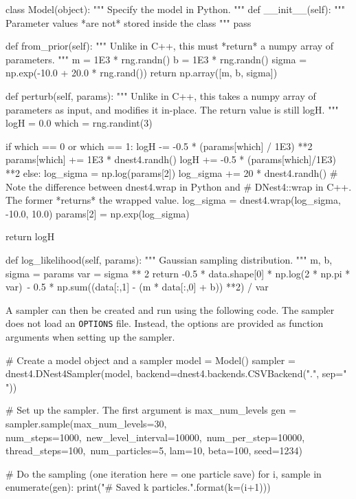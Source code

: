 \documentclass[article, nojss]{jss}
\begin{document}
\begin{CodeChunk}
\begin{CodeInput}
class Model(object):
    """
    Specify the model in Python.
    """
    def __init__(self):
        """
        Parameter values *are not* stored inside the class
        """
        pass

    def from_prior(self):
        """
        Unlike in C++, this must *return* a numpy array of parameters.
        """
        m = 1E3 * rng.randn()
        b = 1E3 * rng.randn()
        sigma = np.exp(-10.0 + 20.0 * rng.rand())
        return np.array([m, b, sigma])

    def perturb(self, params):
        """
        Unlike in C++, this takes a numpy array of parameters as input,
        and modifies it in-place. The return value is still logH.
        """
        logH = 0.0
        which = rng.randint(3)

        if which == 0 or which == 1:
            logH -= -0.5 * (params[which] / 1E3) **2
            params[which] += 1E3 * dnest4.randh()
            logH += -0.5 * (params[which]/1E3) **2
        else:
            log_sigma = np.log(params[2])
            log_sigma += 20 * dnest4.randh()
            # Note the difference between dnest4.wrap in Python and
            # DNest4::wrap in C++. The former *returns* the wrapped value.
            log_sigma = dnest4.wrap(log_sigma, -10.0, 10.0)
            params[2] = np.exp(log_sigma)

        return logH

    def log_likelihood(self, params):
        """
        Gaussian sampling distribution.
        """
        m, b, sigma = params
        var = sigma ** 2
        return -0.5 * data.shape[0] * np.log(2 * np.pi * var)\
                - 0.5 * np.sum((data[:,1] - (m * data[:,0] + b)) **2) / var

\end{CodeInput}
\end{CodeChunk}

A sampler can then be created and run using the following code.
The  sampler does not load an {\tt OPTIONS} file.
Instead, the options are provided as function arguments
when setting up the sampler.
\begin{CodeChunk}
\begin{CodeInput}
# Create a model object and a sampler
model = Model()
sampler = dnest4.DNest4Sampler(model,
                               backend=dnest4.backends.CSVBackend(".",
                                                                  sep=" "))

# Set up the sampler. The first argument is max_num_levels
gen = sampler.sample(max_num_levels=30, num_steps=1000,\
                      new_level_interval=10000,\
                      num_per_step=10000, thread_steps=100,\
                      num_particles=5, lam=10, beta=100, seed=1234)

# Do the sampling (one iteration here = one particle save)
for i, sample in enumerate(gen):
    print("# Saved {k} particles.".format(k=(i+1)))
\end{CodeInput}
\end{CodeChunk}
\end{document}

